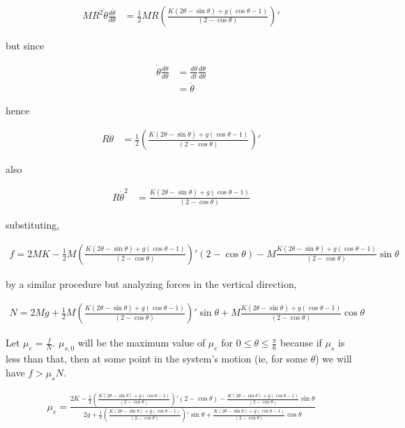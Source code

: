 \documentclass{article}
\newcommand{\half}{\frac{1}{2}}
\begin{document}
\begin{align*}
MR^2 \dot\theta \frac{d\dot\theta}{d\theta} &= \half MR \left(\frac{K(2\theta - \sin\theta)+ g(\cos\theta - 1)}{(2 - \cos\theta)}\right)'
\end{align*}

but since

\begin{align*}
\dot\theta \frac{d\dot\theta}{d\theta} &= \frac{d\theta}{dt} \frac{d\dot\theta}{d\theta} \\
&= \ddot\theta
\end{align*}

hence

\begin{align*}
R \ddot\theta &= \half \left(\frac{K(2\theta - \sin\theta)+ g(\cos\theta - 1)}{(2 - \cos\theta)}\right)'
\end{align*}

also

\begin{align*}
R \dot\theta^2 &= \frac{K(2\theta - \sin\theta)+ g(\cos\theta - 1)}{(2 - \cos\theta)}
\end{align*}

substituting,

\begin{align*}
f = 2MK - \half M \left(\frac{K(2\theta - \sin\theta)+ g(\cos\theta - 1)}{(2 - \cos\theta)}\right)'(2 - \cos\theta) - M\frac{K(2\theta - \sin\theta)+ g(\cos\theta - 1)}{(2 - \cos\theta)}\sin\theta
\end{align*}

by a similar procedure but analyzing forces in the vertical direction,

\begin{align*}
N = 2Mg + \half M\left(\frac{K(2\theta - \sin\theta)+ g(\cos\theta - 1)}{(2 - \cos\theta)}\right)'\sin\theta + M\frac{K(2\theta - \sin\theta)+ g(\cos\theta - 1)}{(2 - \cos\theta)}\cos\theta
\end{align*}

Let $\mu_e = \frac{f}{N}$. $\mu_{s,0}$ will be the maximum value of $\mu_e$ for $0 \le \theta \le \frac{\pi}{6}$ because if $\mu_s$ is less than that, then at some point in the system's motion (ie, for some $\theta$) we will have $f > \mu_s N$.

\begin{align*}
\mu_{e} = \frac{2K - \half \left(\frac{K(2\theta - \sin\theta)+ g(\cos\theta - 1)}{(2 - \cos\theta)}\right)'(2 - \cos\theta) - \frac{K(2\theta - \sin\theta)+ g(\cos\theta - 1)}{(2 - \cos\theta)}\sin\theta}{2g + \half \left(\frac{K(2\theta - \sin\theta)+ g(\cos\theta - 1)}{(2 - \cos\theta)}\right)'\sin\theta + \frac{K(2\theta - \sin\theta)+ g(\cos\theta - 1)}{(2 - \cos\theta)}\cos\theta}
\end{align*}
\end{document}
